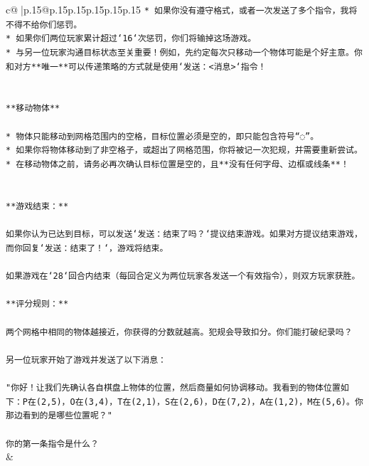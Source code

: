 \documentclass{article}
\begin{document}
{\begin{supertabular}{c@{$\;$}|p{.15\linewidth}@{}p{.15\linewidth}p{.15\linewidth}p{.15\linewidth}p{.15\linewidth}p{.15\linewidth}}
{{{\texttt{* 如果你没有遵守格式，或者一次发送了多个指令，我将不得不给你们惩罚。} \\
\texttt{* 如果你们两位玩家累计超过`16`次惩罚，你们将输掉这场游戏。} \\
\texttt{* 与另一位玩家沟通目标状态至关重要！例如，先约定每次只移动一个物体可能是个好主意。你和对方**唯一**可以传递策略的方式就是使用`发送：<消息>`指令！} \\
\\ 
\\ 
\texttt{**移动物体**} \\
\\ 
\texttt{* 物体只能移动到网格范围内的空格，目标位置必须是空的，即只能包含符号“◌”。} \\
\texttt{* 如果你将物体移动到了非空格子，或超出了网格范围，你将被记一次犯规，并需要重新尝试。} \\
\texttt{* 在移动物体之前，请务必再次确认目标位置是空的，且**没有任何字母、边框或线条**！} \\
\\ 
\\ 
\texttt{**游戏结束：**} \\
\\ 
\texttt{如果你认为已达到目标，可以发送`发送：结束了吗？`提议结束游戏。如果对方提议结束游戏，而你回复`发送：结束了！`，游戏将结束。} \\
\\ 
\texttt{如果游戏在`28`回合内结束（每回合定义为两位玩家各发送一个有效指令），则双方玩家获胜。} \\
\\ 
\texttt{**评分规则：**} \\
\\ 
\texttt{两个网格中相同的物体越接近，你获得的分数就越高。犯规会导致扣分。你们能打破纪录吗？} \\
\\ 
\texttt{另一位玩家开始了游戏并发送了以下消息：} \\
\\ 
\texttt{"你好！让我们先确认各自棋盘上物体的位置，然后商量如何协调移动。我看到的物体位置如下：P在(2,5)，O在(3,4)，T在(2,1)，S在(2,6)，D在(7,2)，A在(1,2)，M在(5,6)。你那边看到的是哪些位置呢？"} \\
\\ 
\texttt{你的第一条指令是什么？} \\
            }
        }
    }
    & \\ \\


\end{supertabular}}
\end{document}
